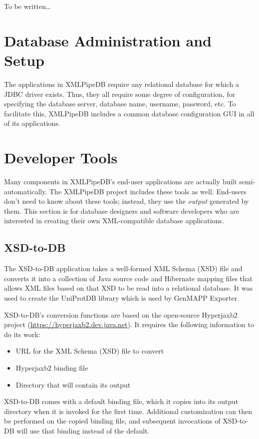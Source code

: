 \documentclass[11pt]{article}
\begin{document}
To be written\ldots

\section{Database Administration and Setup}
\label{dbsetup}

The applications in XMLPipeDB require any relational database for which a JDBC driver exists.  Thus, they all require some degree of configuration, for specifying the database server, database name, username, password, etc.  To facilitate this, XMLPipeDB includes a common database configuration GUI in all of its applications.

\section{Developer Tools}
\label{devtools}

Many components in XMLPipeDB's end-user applications are actually built semi-au\-to\-mat\-ic\-al\-ly.  The XMLPipeDB project includes these tools as well.  End-users don't need to know about these tools; instead, they use the \emph{output} generated by them.  This section is for database designers and software developers who are interested in creating their own XML-compatible database applications.

\subsection{XSD-to-DB}

The XSD-to-DB application takes a well-formed XML Schema (XSD) file and converts it into a collection of Java source code and Hibernate mapping files that allows XML files based on that XSD to be read into a relational database.  It was used to create the UniProtDB library which is used by GenMAPP Exporter.

XSD-to-DB's conversion functions are based on the open-source Hyperjaxb2 project (\url{https://hyperjaxb2.dev.java.net}).  It requires the following information to do its work:
\begin{itemize}
\item URL for the XML Schema (XSD) file to convert
\item Hyperjaxb2 binding file
\item Directory that will contain its output
\end{itemize}
XSD-to-DB comes with a default binding file, which it copies into its output directory when it is invoked for the first time.  Additional customization can then be performed on the copied binding file, and subsequent invocations of XSD-to-DB will use that binding instead of the default.
\end{document}
